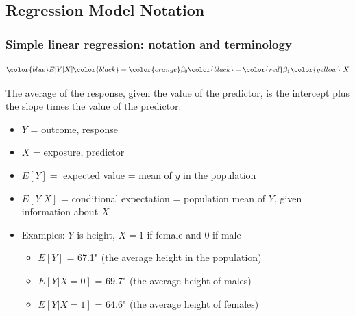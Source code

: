 \documentclass[12pt, 
hyperref={colorlinks=true, linkcolor=blue, urlcolor=cyan}]{beamer}
\begin{document}
\subsection{Regression Model Notation}
\begin{frame}
\frametitle{Simple linear regression: notation and terminology}
$$\color{blue} E[Y|X] \color{black} = \color{orange} \beta_0 \color{black} + \color{red} \beta_1 \color{yellow} \ X$$ \vspace{-0.6cm}

\color{blue}The average of the response, given the value of the predictor, \color{black} is \color{orange} the intercept \color{black} plus \color{red} the slope \color{black} times \color{yellow} the value of the predictor.\color{black} \pause

\vspace{-0.2cm}
\begin{itemize}
\item $Y$ = outcome, response
\item $X$ = exposure, predictor \pause
\item $E[Y] =$ expected value =  mean of $y$ in the population \pause
\item $E[Y|X]$ = conditional expectation = population mean of $Y$, given information about $X$	\pause
\item Examples: $Y$ is height, $X = 1$ if female and $0$ if male
	\begin{itemize}
	\item $E[Y]$ = 67.1" (the average height in the population)
	\item $E[Y|X = 0]$ = 69.7" (the average height of males)
	\item $E[Y|X = 1]$ = 64.6" (the average height of females)
	\end{itemize}
\end{itemize}
\end{frame}

\end{document}
